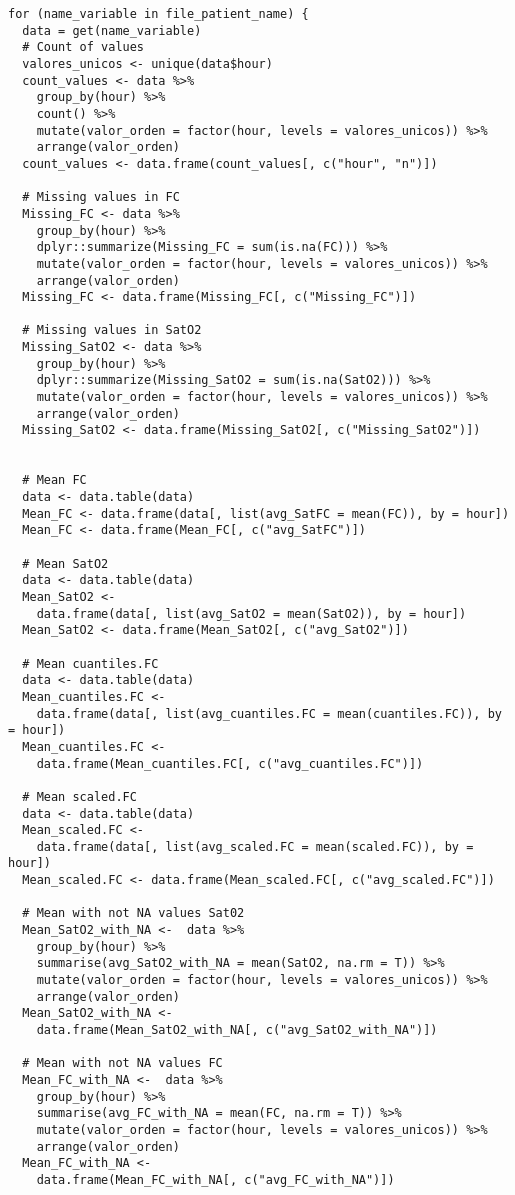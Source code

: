 \begin{lstlisting}[style=mystyle,caption={Cálculo de Medias y Cantidad de Valores Faltantes}, label={lst:medias-y-faltantes}]
    for (name_variable in file_patient_name) {
  data = get(name_variable)
  # Count of values
  valores_unicos <- unique(data$hour)
  count_values <- data %>%
    group_by(hour) %>%
    count() %>%
    mutate(valor_orden = factor(hour, levels = valores_unicos)) %>%
    arrange(valor_orden)
  count_values <- data.frame(count_values[, c("hour", "n")])
  
  # Missing values in FC
  Missing_FC <- data %>%
    group_by(hour) %>%
    dplyr::summarize(Missing_FC = sum(is.na(FC))) %>%
    mutate(valor_orden = factor(hour, levels = valores_unicos)) %>%
    arrange(valor_orden)
  Missing_FC <- data.frame(Missing_FC[, c("Missing_FC")])
  
  # Missing values in SatO2
  Missing_SatO2 <- data %>%
    group_by(hour) %>%
    dplyr::summarize(Missing_SatO2 = sum(is.na(SatO2))) %>%
    mutate(valor_orden = factor(hour, levels = valores_unicos)) %>%
    arrange(valor_orden)
  Missing_SatO2 <- data.frame(Missing_SatO2[, c("Missing_SatO2")])
  
  
  # Mean FC
  data <- data.table(data)
  Mean_FC <- data.frame(data[, list(avg_SatFC = mean(FC)), by = hour])
  Mean_FC <- data.frame(Mean_FC[, c("avg_SatFC")])
  
  # Mean SatO2
  data <- data.table(data)
  Mean_SatO2 <-
    data.frame(data[, list(avg_SatO2 = mean(SatO2)), by = hour])
  Mean_SatO2 <- data.frame(Mean_SatO2[, c("avg_SatO2")])
  
  # Mean cuantiles.FC
  data <- data.table(data)
  Mean_cuantiles.FC <-
    data.frame(data[, list(avg_cuantiles.FC = mean(cuantiles.FC)), by = hour])
  Mean_cuantiles.FC <-
    data.frame(Mean_cuantiles.FC[, c("avg_cuantiles.FC")])
  
  # Mean scaled.FC
  data <- data.table(data)
  Mean_scaled.FC <-
    data.frame(data[, list(avg_scaled.FC = mean(scaled.FC)), by = hour])
  Mean_scaled.FC <- data.frame(Mean_scaled.FC[, c("avg_scaled.FC")])
  
  # Mean with not NA values Sat02
  Mean_SatO2_with_NA <-  data %>%
    group_by(hour) %>%
    summarise(avg_SatO2_with_NA = mean(SatO2, na.rm = T)) %>%
    mutate(valor_orden = factor(hour, levels = valores_unicos)) %>%
    arrange(valor_orden)
  Mean_SatO2_with_NA <-
    data.frame(Mean_SatO2_with_NA[, c("avg_SatO2_with_NA")])
  
  # Mean with not NA values FC
  Mean_FC_with_NA <-  data %>%
    group_by(hour) %>%
    summarise(avg_FC_with_NA = mean(FC, na.rm = T)) %>%
    mutate(valor_orden = factor(hour, levels = valores_unicos)) %>%
    arrange(valor_orden)
  Mean_FC_with_NA <-
    data.frame(Mean_FC_with_NA[, c("avg_FC_with_NA")])
  

\end{lstlisting}
